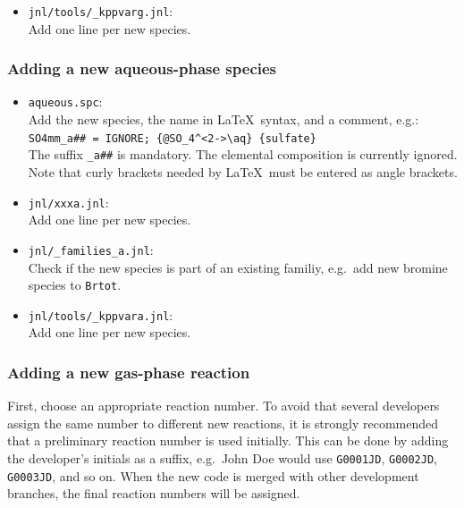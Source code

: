 \documentclass[twoside]{article}
\def\nosep{\setlength\parsep{0mm}\setlength\topsep{0mm}\setlength\itemsep{0mm}}
\begin{document}
\begin{itemize}\nosep
\item \verb|jnl/tools/_kppvarg.jnl|:\\
  Add one line per new species.
\end{itemize}

\subsubsection{Adding a new aqueous-phase species}

\begin{itemize}\nosep
\item \verb|aqueous.spc|:\\
  Add the new species, the name in La\TeX\ syntax, and a comment,
  e.g.:\\
  \verb|SO4mm_a## = IGNORE; {@SO_4^<2->\aq} {sulfate}|\\
  The suffix \verb|_a##| is mandatory. The elemental composition is
  currently ignored. Note that curly brackets needed by La\TeX\ must be
  entered as angle brackets.
\end{itemize}

\begin{itemize}\nosep
\item \verb|jnl/xxxa.jnl|:\\
  Add one line per new species. 
\end{itemize}

\begin{itemize}\nosep
\item \verb|jnl/_families_a.jnl|:\\
  Check if the new species is part of an existing familiy, e.g.\ add new
  bromine species to \verb|Brtot|.
\end{itemize}

\begin{itemize}\nosep
\item \verb|jnl/tools/_kppvara.jnl|:\\
  Add one line per new species.
\end{itemize}

\subsubsection{Adding a new gas-phase reaction}
\label{sec:addgprxn}

First, choose an appropriate reaction number. To avoid that several
developers assign the same number to different new reactions, it is
strongly recommended that a preliminary reaction number is used
initially. This can be done by adding the developer's initials as a
suffix, e.g.\ John Doe would use \verb|G0001JD|, \verb|G0002JD|,
\verb|G0003JD|, and so on. When the new code is merged with other
development branches, the final reaction numbers will be assigned.
\end{document}

